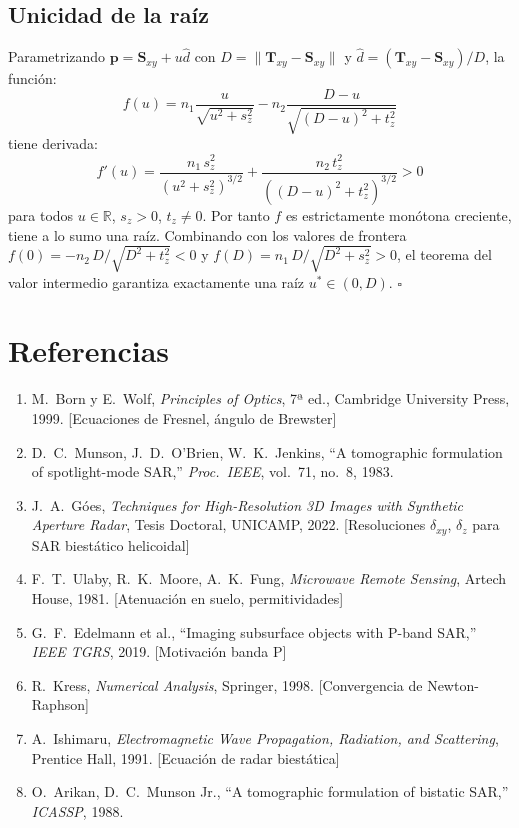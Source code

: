 \documentclass[12pt,a4paper,oneside]{book}
\newcommand{\dxy}{\delta_{xy}}
\newcommand{\dz}{\delta_z}
\begin{document}
\section{Unicidad de la raíz}

Parametrizando $\mathbf{p} = \mathbf{S}_{xy} + u\hat{d}$ con $D = \|\mathbf{T}_{xy}-\mathbf{S}_{xy}\|$ y $\hat{d} = (\mathbf{T}_{xy}-\mathbf{S}_{xy})/D$, la función:
\[
f(u) = n_1\frac{u}{\sqrt{u^2+s_z^2}} - n_2\frac{D-u}{\sqrt{(D-u)^2+t_z^2}}
\]
tiene derivada:
\[
f'(u) = \frac{n_1\,s_z^2}{(u^2+s_z^2)^{3/2}} + \frac{n_2\,t_z^2}{((D-u)^2+t_z^2)^{3/2}} > 0
\]
para todos $u\in\mathbb{R}$, $s_z>0$, $t_z\neq 0$. Por tanto $f$ es estrictamente monótona creciente, tiene a lo sumo una raíz. Combinando con los valores de frontera $f(0) = -n_2\,D/\sqrt{D^2+t_z^2} < 0$ y $f(D) = n_1\,D/\sqrt{D^2+s_z^2} > 0$, el teorema del valor intermedio garantiza exactamente una raíz $u^*\in(0,D)$. $\square$

\backmatter
\chapter*{Referencias}

\begin{enumerate}
  \item M.\ Born y E.\ Wolf, \emph{Principles of Optics}, 7ª ed., Cambridge University Press, 1999. [Ecuaciones de Fresnel, ángulo de Brewster]
  \item D.\ C.\ Munson, J.\ D.\ O'Brien, W.\ K.\ Jenkins, ``A tomographic formulation of spotlight-mode SAR,'' \emph{Proc.\ IEEE}, vol.\ 71, no.\ 8, 1983.
  \item J.\ A.\ Góes, \emph{Techniques for High-Resolution 3D Images with Synthetic Aperture Radar}, Tesis Doctoral, UNICAMP, 2022. [Resoluciones $\dxy$, $\dz$ para SAR biestático helicoidal]
  \item F.\ T.\ Ulaby, R.\ K.\ Moore, A.\ K.\ Fung, \emph{Microwave Remote Sensing}, Artech House, 1981. [Atenuación en suelo, permitividades]
  \item G.\ F.\ Edelmann et al., ``Imaging subsurface objects with P-band SAR,'' \emph{IEEE TGRS}, 2019. [Motivación banda P]
  \item R.\ Kress, \emph{Numerical Analysis}, Springer, 1998. [Convergencia de Newton-Raphson]
  \item A.\ Ishimaru, \emph{Electromagnetic Wave Propagation, Radiation, and Scattering}, Prentice Hall, 1991. [Ecuación de radar biestática]
  \item O.\ Arikan, D.\ C.\ Munson Jr., ``A tomographic formulation of bistatic SAR,'' \emph{ICASSP}, 1988.
\end{enumerate}
\end{document}
